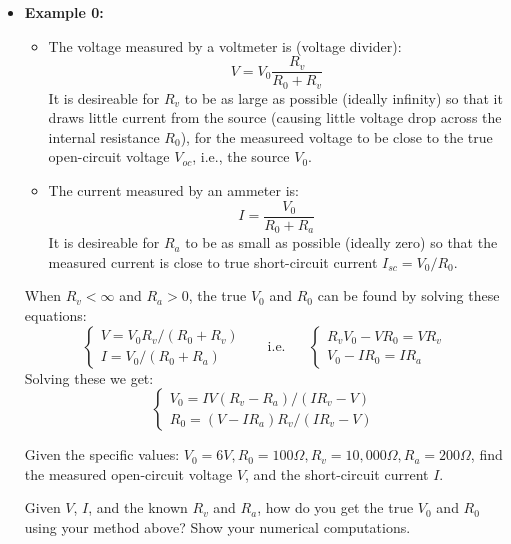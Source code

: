 \usepackage{html}



\begin{itemize}

\item {\bf Example 0:}



  \begin{itemize}

  \item The voltage measured by a voltmeter is (voltage divider):
    \[ V=V_0 \frac{R_v}{R_0+R_v} \]
    It is desireable for $R_v$ to be as large as possible (ideally infinity) so 
    that it draws little current from the source (causing little voltage drop 
    across the internal resistance $R_0$), for the measureed voltage to be 
    close to the true open-circuit voltage $V_{oc}$, i.e., the source $V_0$. 

  \item  The current measured by an ammeter is:
    \[ I=\frac{V_0}{R_0+R_a} \]
    It is desireable for $R_a$ to be as small as possible (ideally zero)
    so that the measured current is close to true short-circuit current 
    $I_{sc}=V_0/R_0$.
  \end{itemize}

  When $R_v<\infty$ and $R_a>0$, the true $V_0$ and $R_0$ can be found by
  solving these equations:
  \[ \left\{ \begin{array}{l}
     V=V_0 R_v/(R_0+R_v) \\I=V_0/(R_0+R_a) \end{array} \right. 
  \;\;\;\;\;\;\mbox{i.e.}\;\;\;\;\;\;
  \left\{ \begin{array}{l}
    R_vV_0-VR_0=VR_v \\ V_0-IR_0=I R_a \end{array} \right. \]
  Solving these we get:
  \[ \left\{ \begin{array}{l}
    V_0=IV(R_v-R_a)/(IR_v-V) \\
    R_0=(V-IR_a)R_v/(IR_v-V)
  \end{array} \right. \]

  Given the specific values: $V_0=6V, R_0=100\Omega, R_v=10,000 \Omega, R_a=200 \Omega$,
  find the measured open-circuit voltage $V$, and the short-circuit current 
  $I$. 

  Given $V$, $I$, and the known $R_v$ and $R_a$, how do you get the true 
  $V_0$ and $R_0$ using your method above? Show your numerical computations.


\end{itemize}
